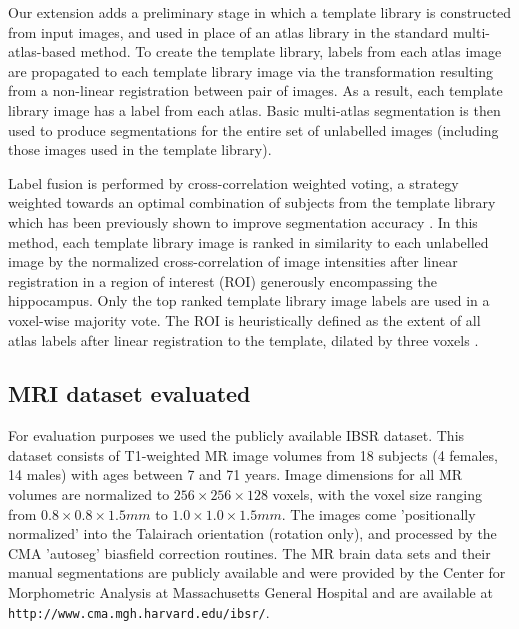 \documentclass{article}\usepackage{graphicx, color}
\begin{document}
Our extension adds a preliminary stage in which a template library is
constructed from input images, and used in place of an atlas library in the
standard multi-atlas-based method.  To create the template library, labels from
each atlas image are propagated to each template library image via the
transformation resulting from a non-linear registration between pair of images.
As a result, each template library image has a label from each atlas.
Basic multi-atlas segmentation is then used to produce segmentations for the
entire set of unlabelled images (including those images used in the template
library). 

Label fusion is performed by cross-correlation weighted voting, a strategy
weighted towards an optimal combination of subjects from the template library
which has been previously shown to improve segmentation
accuracy \citep{Aljabar2009,Collins2010}. In this method, each template library
image is ranked in similarity to each unlabelled image by the normalized
cross-correlation of image intensities after linear registration in a region of
interest (ROI) generously encompassing the hippocampus.  Only the top ranked
template library image labels are used in a voxel-wise majority vote. The ROI
is heuristically defined as the extent of all atlas labels after linear
registration to the template, dilated by three voxels \citep{Chakravarty2012}.

\subsection{MRI dataset evaluated}

For evaluation purposes we used the publicly available IBSR dataset.  This
dataset consists of T1-weighted MR image volumes from 18 subjects (4 females,
14 males) with ages between 7 and 71 years. Image dimensions for all MR volumes
are normalized to  $256  \times 256 \times 128$ voxels, with the voxel size
ranging from $0.8 \times 0.8 \times 1.5 mm$ to $1.0 \times 1.0 \times 1.5 mm$.
The images come 'positionally normalized' into the Talairach orientation
(rotation only), and processed by the CMA 'autoseg' biasfield correction
routines. The MR brain data sets and their manual segmentations are publicly
available and were provided by the Center for Morphometric Analysis at
Massachusetts General Hospital and are available at
{\tt http://www.cma.mgh.harvard.edu/ibsr/}.
\end{document}
